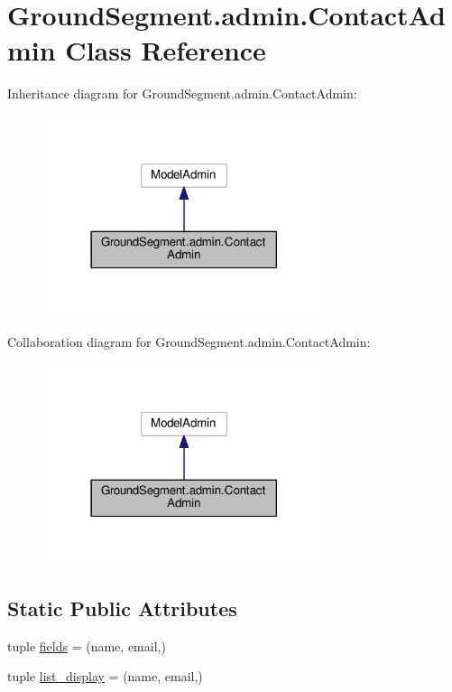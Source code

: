 \hypertarget{class_ground_segment_1_1admin_1_1_contact_admin}{}\section{Ground\+Segment.\+admin.\+Contact\+Admin Class Reference}
\label{class_ground_segment_1_1admin_1_1_contact_admin}


Inheritance diagram for Ground\+Segment.\+admin.\+Contact\+Admin\+:\nopagebreak
\begin{figure}[H]
\begin{center}
\leavevmode
\includegraphics[width=234pt]{class_ground_segment_1_1admin_1_1_contact_admin__inherit__graph}
\end{center}
\end{figure}


Collaboration diagram for Ground\+Segment.\+admin.\+Contact\+Admin\+:\nopagebreak
\begin{figure}[H]
\begin{center}
\leavevmode
\includegraphics[width=234pt]{class_ground_segment_1_1admin_1_1_contact_admin__coll__graph}
\end{center}
\end{figure}
\subsection*{Static Public Attributes}
\begin{DoxyCompactItemize}
\item 
tuple \hyperlink{class_ground_segment_1_1admin_1_1_contact_admin_a7b3018f6da7c9eced691fae7a6229a70}{fields} = (\textquotesingle{}name\textquotesingle{}, \textquotesingle{}email\textquotesingle{},)
\item 
tuple \hyperlink{class_ground_segment_1_1admin_1_1_contact_admin_a6dda75f284db38fa53b8b9d4f9116459}{list\+\_\+display} = (\textquotesingle{}name\textquotesingle{}, \textquotesingle{}email\textquotesingle{},)
\end{DoxyCompactItemize}


